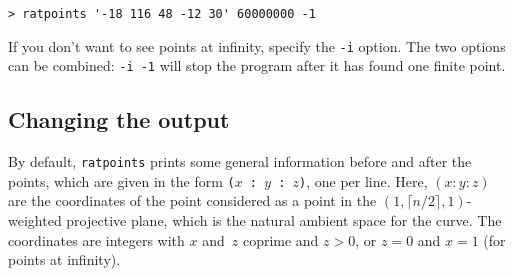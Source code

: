 \documentclass[12pt,a4paper,oneside]{amsart}
\begin{document}
\verb+> ratpoints '-18 116 48 -12 30' 60000000 -1+

If you don't want to see points at infinity, specify the \verb+-i+ option.
The two options can be combined: \verb+-i -1+ will stop the program after
it has found one finite point.

\subsection{Changing the output}

By default, \texttt{ratpoints} prints some general information before and
after the points, which are given in the form
\verb+(+$x$\verb+ : +$y$\verb+ : +$z$\verb+)+, one per line.
Here, $(x : y : z)$ are the coordinates of the point considered as a point
in the $(1, \lceil n/2\rceil, 1)$-weighted projective plane, which is the
natural ambient space for the curve. The coordinates are integers with
$x$ and~$z$ coprime and $z > 0$, or $z = 0$ and $x = 1$ (for points at
infinity).
\end{document}
